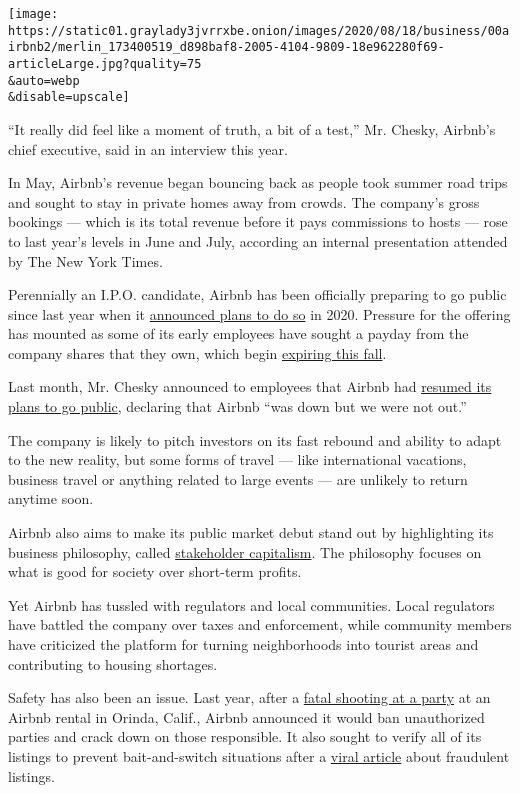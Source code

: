 \texttt{[image: https://static01.graylady3jvrrxbe.onion/images/2020/08/18/business/00airbnb2/merlin\_173400519\_d898baf8-2005-4104-9809-18e962280f69-articleLarge.jpg?quality=75\\\&auto=webp\\\&disable=upscale]}

``It really did feel like a moment of truth, a bit of a test,'' Mr.
Chesky, Airbnb's chief executive, said in an interview this year.

In May, Airbnb's revenue began bouncing back as people took summer road
trips and sought to stay in private homes away from crowds. The
company's gross bookings --- which is its total revenue before it pays
commissions to hosts --- rose to last year's levels in June and July,
according an internal presentation attended by The New York Times.

Perennially an I.P.O. candidate, Airbnb has been officially preparing to
go public since last year when it
\href{https://www.nytimes3xbfgragh.onion/2019/09/19/technology/airbnb-ipo-2020.html}{announced
plans to do so} in 2020. Pressure for the offering has mounted as some
of its early employees have sought a payday from the company shares that
they own, which begin
\href{https://www.nytimes3xbfgragh.onion/2019/09/20/technology/airbnb-employees-ipo-payouts.html}{expiring
this fall}.

Last month, Mr. Chesky announced to employees that Airbnb had
\href{https://www.nytimes3xbfgragh.onion/2020/07/15/technology/airbnb-ipo.html}{resumed
its plans to go public}, declaring that Airbnb ``was down but we were
not out.''

The company is likely to pitch investors on its fast rebound and ability
to adapt to the new reality, but some forms of travel --- like
international vacations, business travel or anything related to large
events --- are unlikely to return anytime soon.

Airbnb also aims to make its public market debut stand out by
highlighting its business philosophy, called
\href{https://www.nytimes3xbfgragh.onion/2020/01/17/business/dealbook/airbnb-stakeholders-corporate-governance.html}{stakeholder
capitalism}. The philosophy focuses on what is good for society over
short-term profits.

Yet Airbnb has tussled with regulators and local communities. Local
regulators have battled the company over taxes and enforcement, while
community members have criticized the platform for turning neighborhoods
into tourist areas and contributing to housing shortages.

Safety has also been an issue. Last year, after a
\href{https://www.nytimes3xbfgragh.onion/2019/11/01/us/orinda-shooting.html}{fatal
shooting at a party} at an Airbnb rental in Orinda, Calif., Airbnb
announced it would ban unauthorized parties and crack down on those
responsible. It also sought to verify all of its listings to prevent
bait-and-switch situations after a
\href{https://www.vice.com/en_us/article/43k7z3/nationwide-fake-host-scam-on-airbnb}{viral
article} about fraudulent listings.

